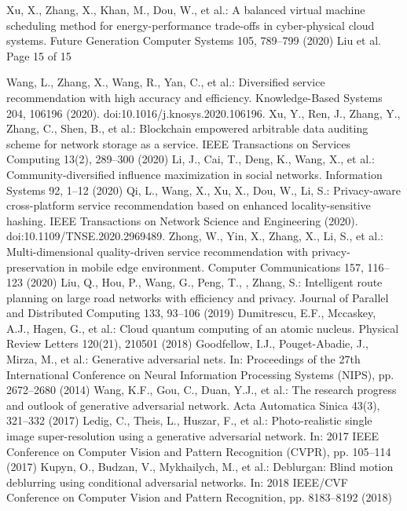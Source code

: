 \documentclass{bmcart}
\begin{document}
\begin{backmatter}
\begin{thebibliography}{99}
Xu, X., Zhang, X., Khan, M., Dou, W., et al.: A balanced virtual machine scheduling method for energy-performance trade-offs in cyber-physical cloud systems. Future Generation Computer Systems 105, 789–799 (2020)
Liu et al. Page 15 of 15

Wang, L., Zhang, X., Wang, R., Yan, C., et al.: Diversified service recommendation with high accuracy and efficiency. Knowledge-Based Systems 204, 106196 (2020). doi:10.1016/j.knosys.2020.106196.
Xu, Y., Ren, J., Zhang, Y., Zhang, C., Shen, B., et al.: Blockchain empowered arbitrable data auditing scheme for network storage as a service. IEEE Transactions on Services Computing 13(2), 289–300 (2020) 
Li, J., Cai, T., Deng, K., Wang, X., et al.: Community-diversified influence maximization in social networks. Information Systems 92, 1–12 (2020) 
Qi, L., Wang, X., Xu, X., Dou, W., Li, S.: Privacy-aware cross-platform service recommendation based on enhanced locality-sensitive hashing. IEEE Transactions on Network Science and Engineering (2020). doi:10.1109/TNSE.2020.2969489. 
Zhong, W., Yin, X., Zhang, X., Li, S., et al.: Multi-dimensional quality-driven service recommendation with privacy-preservation in mobile edge environment. Computer Communications 157, 116–123 (2020) 
Liu, Q., Hou, P., Wang, G., Peng, T., , Zhang, S.: Intelligent route planning on large road networks with efficiency and privacy. Journal of Parallel and Distributed Computing 133, 93–106 (2019) 
 Dumitrescu, E.F., Mccaskey, A.J., Hagen, G., et al.: Cloud quantum computing of an atomic nucleus. Physical Review Letters 120(21), 210501 (2018) 
Goodfellow, I.J., Pouget-Abadie, J., Mirza, M., et al.: Generative adversarial nets. In: Proceedings of the 27th International Conference on Neural Information Processing Systems (NIPS), pp. 2672–2680 (2014) 
 Wang, K.F., Gou, C., Duan, Y.J., et al.: The research progress and outlook of generative adversarial network. Acta Automatica Sinica 43(3), 321–332 (2017) 
Ledig, C., Theis, L., Huszar, F., et al.: Photo-realistic single image super-resolution using a generative adversarial network. In: 2017 IEEE Conference on Computer Vision and Pattern Recognition (CVPR), pp. 105–114 (2017) 
 Kupyn, O., Budzan, V., Mykhailych, M., et al.: Deblurgan: Blind motion deblurring using conditional adversarial networks. In: 2018 IEEE/CVF Conference on Computer Vision and Pattern Recognition, pp. 8183–8192 (2018) 

\end{thebibliography}
\end{backmatter}
\end{document}
